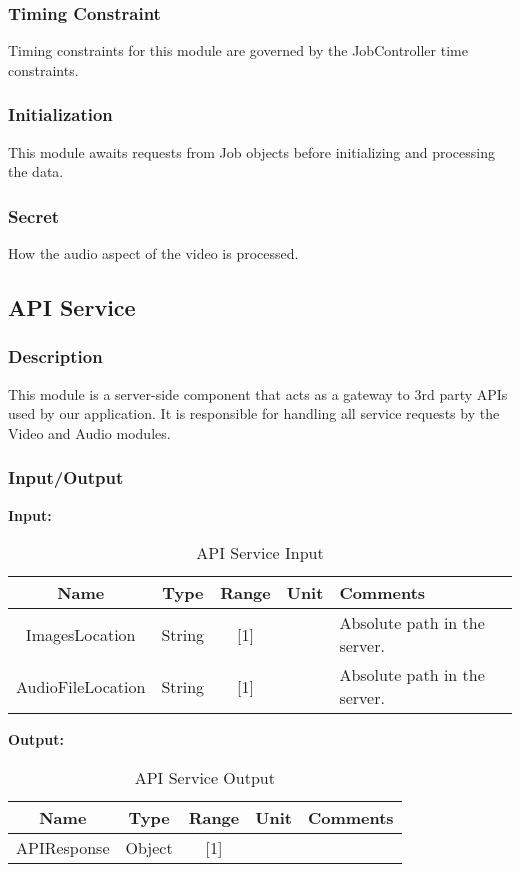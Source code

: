 \documentclass{article}
\begin{document}
\subsubsection{Timing Constraint}
Timing constraints for this module are governed by the JobController time constraints. 

\subsubsection{Initialization}
This module awaits requests from Job objects before initializing and processing the data.

\subsubsection{Secret}
How the audio aspect of the video is processed.

\subsection{API Service}

\subsubsection{Description}
This module is a server-side component that acts as a gateway to 3rd party APIs used by our application. It is responsible for handling all service requests by the Video and Audio modules.

\subsubsection{Input/Output}
\textbf{Input:}
\begin{table}[H]
    \caption{API Service Input}
    \centering
    \begin{tabularx}{0.7\textwidth}{|c|c|c|c|X|} \hline
        \textbf{Name} & \textbf{Type} & \textbf{Range} & \textbf{Unit} & \textbf{Comments} \\ \hline
        ImagesLocation & String & [1] & & Absolute path in the server. \\ \hline
        AudioFileLocation & String & [1] & & Absolute path in the server. \\ \hline
    \end{tabularx}
    \label{tab:API_Service_Input}
\end{table}

\textbf{Output:}
\begin{table}[H]
    \caption{API Service Output} 
    \centering
    \begin{tabularx}{0.7\textwidth}{|c|c|c|c|X|} \hline
        \textbf{Name} & \textbf{Type} & \textbf{Range} & \textbf{Unit} & \textbf{Comments} \\ \hline
        APIResponse & Object & [1] & & \\ \hline
    \end{tabularx}
    \label{tab:API_Service_Output}
\end{table}
\end{document}
